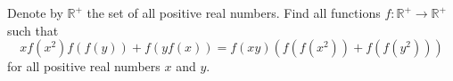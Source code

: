 Denote by $\mathbb{R}^{+}$ the set of all positive real numbers. Find all functions $f : \mathbb{R}^{+} \to \mathbb{R}^{+}$ such that
\[
xf(x^{2})f(f(y)) + f(yf(x)) = f(xy)\left(f(f(x^{2})) + f(f(y^{2}))\right)
\]
for all positive real numbers $x$ and $y$.
